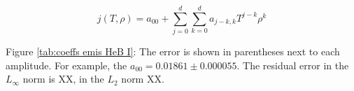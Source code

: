 \documentclass[final,leqno,onefignum,onetabnum]{siamltex1213}
\begin{document}
  \begin{equation}
    j(T,\rho) = a_{00} + \sum_{j=0}^{d}\sum_{k=0}^{d} a_{j-k,k}T^{j-k}\rho^{k}
  \end{equation}

Figure \ref{tab:coeffs emis HeB I}: The error is shown in parentheses next to each amplitude. For example, the $a_{00} = 0.01861 \pm 0.000055$. The residual error in the $L_{\infty}$ norm is XX, in the $L_{2}$ norm XX.
\clearpage



\end{document}
